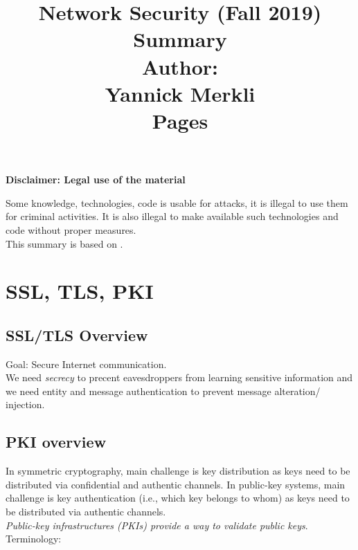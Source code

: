 \documentclass[11pt,oneside,a4paper]{article}
\title{
    \vspace*{0.0mm}
    \LARGE\bf\sf Network Security (Fall 2019)
    \vspace*{10.0mm} \\
    \Huge\bf\sf Summary
    \vspace*{30.0mm} \\
    \normalsize
    \sf Author:\\[5pt]
    \sf Yannick Merkli\\ [5pt]
    \sf \pageref{lastpage} Pages
}
\date{}
\begin{document}
\maketitle
\thispagestyle{empty}
\raggedbottom
\clearpage


\clearpage
\setcounter{tocdepth}{2}
\tableofcontents
\clearpage
{}

\begin{center}
	\noindent \textbf{\LARGE Disclaimer: Legal use of the material}
	
	\noindent Some knowledge, technologies, code is usable for attacks, it is illegal to use them for criminal activities. It is also illegal to make available such technologies and code without proper measures.\\
	This summary is based on \cite{netsec}.
\end{center}


\newpage

\section{SSL, TLS, PKI}

\subsection{SSL/TLS Overview}

Goal: Secure Internet communication.\\
We need \textit{secrecy} to precent eavesdroppers from learning sensitive information and we need entity and message authentication to prevent message alteration/ injection.

\subsection{PKI overview}

In symmetric cryptography, main challenge is key distribution as keys need to be distributed via confidential and authentic channels. In public-key systems, main challenge is key authentication (i.e., which key belongs to whom) as keys need to be distributed via authentic channels.\\
\textit{Public-key infrastructures (PKIs) provide a way to validate public keys}.\\

\noindent Terminology: 
\end{document}
